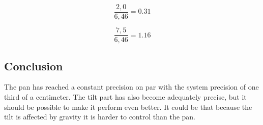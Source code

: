 \[ \frac{2,0}{6,46} = 0.31 \]

\[ \frac{7,5}{6,46} = 1.16 \]

\subsection*{Conclusion}
The pan has reached a constant precision on par with the system precision
of one third of a centimeter. The tilt part has also become adequately precise, but
it should be possible to make it perform even better. It could be that because the
tilt is affected by gravity it is harder to control than the pan.


